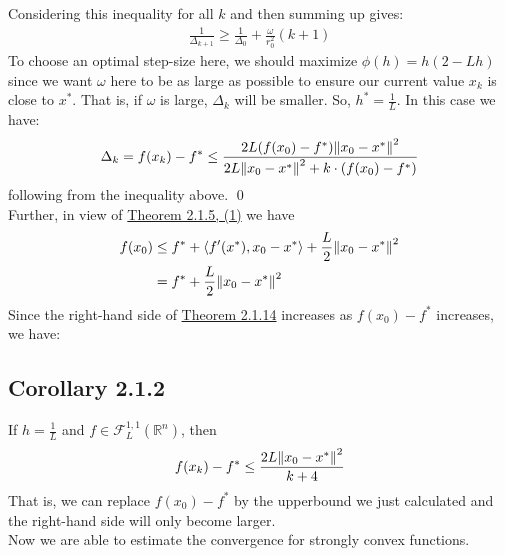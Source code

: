 \documentclass[12pt,a4paper]{article}
\begin{document}
	 Considering this inequality for all $k$ and then summing up gives:
	 \begin{align*}
	 	\frac{1}{\Delta_{k+1}} \geq \frac{1}{\Delta_0} + \frac{\omega}{r_0^2}(k+1)
	 \end{align*}
	 To choose an optimal step-size here, we should maximize $\phi(h) = h(2 - Lh)$ since we want $\omega$ here to be as large as possible to ensure our current value $x_k$ is close to $x^*$. That is, if $\omega$ is large, $\Delta_k$ will be smaller. So, $h^* = \frac{1}{L}$. In this case we have:
	 \begin{align*}
	 	\Delta_k = f(x_k) - f^* \leq \frac{2L(f(x_0) - f^*)\norm{x_0 - x^*}^2}{2L\norm{x_0 - x^*}^2+ k  \cdot (f(x_0) - f^*)} 
	 \end{align*}
	 following from the inequality above. \qed\\
	 Further, in view of \hyperref[thm215]{Theorem 2.1.5, (1)} we have
	 \begin{align*}
	 	f(x_0) &\leq f^* + \langle f'(x^*), x_0 - x^* \rangle + \frac{L}{2}\norm{x_0 - x^*}^2 \\
	 	&= f^* + \frac{L}{2}\norm{x_0 - x^*}^2
	 \end{align*}
	 Since the right-hand side of \hyperref[thm2114]{Theorem 2.1.14} increases as $f(x_0) - f^*$ increases, we have:
	 \subsection*{Corollary 2.1.2}\label{cor212}
	 If $h = \frac{1}{L}$ and $f \in \mathcal{F}_L^{1,1}(\mathbb{R}^n)$, then
	 \begin{align*}
	 	f(x_k) - f^* \leq \frac{2L\norm{x_0 - x^*}^2}{k+4}
	 \end{align*}
	 That is, we can replace $f(x_0) - f^*$ by the upperbound we just calculated and the right-hand side will only become larger.\\
	 Now we are able to estimate the convergence for strongly convex functions.
\end{document}
